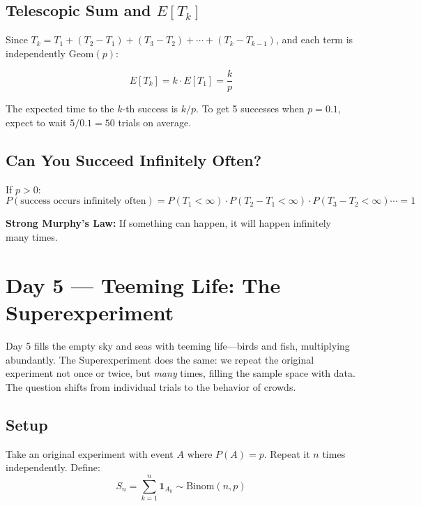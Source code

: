 \documentclass[11pt]{article}
\begin{document}
\subsection{Telescopic Sum and $E[T_k]$}

Since $T_k = T_1 + (T_2 - T_1) + (T_3 - T_2) + \cdots + (T_k - T_{k-1})$, and each term is independently $\text{Geom}(p)$:

\[
\boxed{E[T_k] = k \cdot E[T_1] = \frac{k}{p}}
\]

\begin{conceptbox}
The expected time to the $k$-th success is $k/p$. To get 5 successes when $p = 0.1$, expect to wait $5/0.1 = 50$ trials on average.
\end{conceptbox}

\subsection{Can You Succeed Infinitely Often?}

If $p > 0$:
\[
P(\text{success occurs infinitely often}) = P(T_1 < \infty) \cdot P(T_2 - T_1 < \infty) \cdot P(T_3 - T_2 < \infty) \cdots = 1
\]

\textbf{Strong Murphy's Law:} If something can happen, it will happen infinitely many times.

\section{Day 5 --- Teeming Life: The Superexperiment}

\begin{creationbox}
Day 5 fills the empty sky and seas with teeming life---birds and fish, multiplying abundantly. The Superexperiment does the same: we repeat the original experiment not once or twice, but \emph{many} times, filling the sample space with data. The question shifts from individual trials to the behavior of crowds.
\end{creationbox}

\subsection{Setup}

Take an original experiment with event $A$ where $P(A) = p$. Repeat it $n$ times independently. Define:
\[
S_n = \sum_{k=1}^{n} \mathbf{1}_{A_k} \sim \text{Binom}(n, p)
\]
\end{document}

